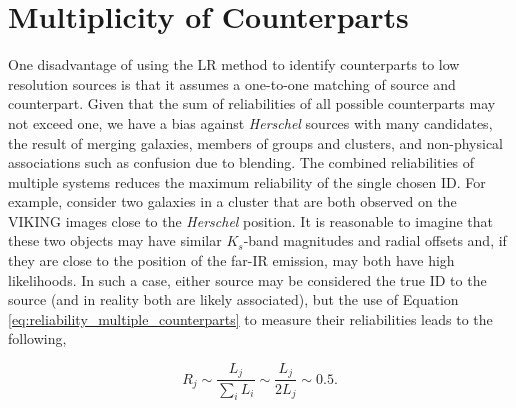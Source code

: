 \section{Multiplicity of Counterparts}
\label{sec:multiplicity}

One disadvantage of using the LR method to identify counterparts to low resolution sources is that it assumes a one-to-one matching of source and counterpart. Given that the sum of reliabilities of all possible counterparts may not exceed one, we have a bias against \textit{Herschel} sources with many candidates, the result of merging galaxies, members of groups and clusters, and non-physical associations such as confusion due to blending. The combined reliabilities of multiple systems reduces the maximum reliability of the single chosen ID. For example, consider two galaxies in a cluster that are both observed on the VIKING images close to the \textit{Herschel} position. It is reasonable to imagine that these two objects may have similar $K_s$-band magnitudes and radial offsets and, if they are close to the position of the far-IR emission, may both have high likelihoods. In such a case, either source may be considered the true ID to the source (and in reality both are likely associated), but the use of Equation \ref{eq:reliability_multiple_counterparts} to measure their reliabilities leads to the following, 

\begin{equation}
    R_j \sim \frac{L_j}{\sum_i L_i} \sim \frac{L_j}{2L_j} \sim 0.5.
\end{equation}

